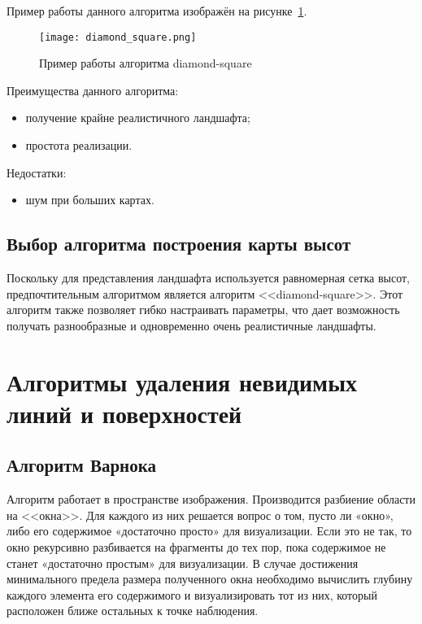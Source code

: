 Пример работы данного алгоритма изображён на рисунке~\ref{fig:diamond_square}.

\begin{figure}[H]
	\centering
	\texttt{[image: diamond\_square.png]}
	\caption{Пример работы алгоритма diamond-square}
	\label{fig:diamond_square}
\end{figure}

Преимущества данного алгоритма:
\begin{itemize}
	\item получение крайне реалистичного ландшафта;
	\item простота реализации.
\end{itemize}

Недостатки:

\begin{itemize}
	\item шум при больших картах.
\end{itemize}

\subsection*{Выбор алгоритма построения карты высот}

Поскольку для представления ландшафта используется равномерная сетка высот, предпочтительным алгоритмом является алгоритм <<diamond-square>>. Этот алгоритм также позволяет гибко настраивать параметры, что дает возможность получать разнообразные и одновременно очень реалистичные ландшафты.

\section{Алгоритмы удаления невидимых линий и поверхностей}

\subsection{Алгоритм Варнока}

Алгоритм работает в пространстве изображения. Производится разбиение области на <<окна>>. Для каждого из них решается вопрос о том, пусто ли «окно», либо его содержимое «достаточно просто» для визуализации. Если это не так, то окно рекурсивно разбивается на фрагменты до тех пор, пока содержимое не станет «достаточно простым» для визуализации. В случае достижения минимального предела размера полученного окна необходимо вычислить глубину каждого элемента его содержимого и визуализировать тот из них, который расположен ближе остальных к точке наблюдения. 

